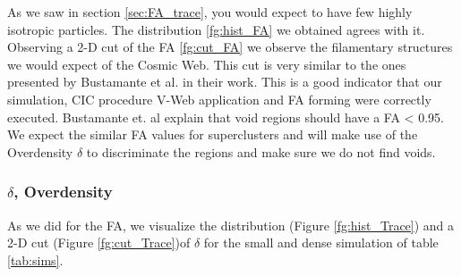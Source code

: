 \documentclass[12pt]{article}
\begin{document}
\begin{par}
As we saw in section \ref{sec:FA_trace}, you would
 expect to have few highly isotropic particles.
  The distribution \ref{fg:hist_FA} we obtained
   agrees with it.\\
Observing a 2-D cut of the FA \ref{fg:cut_FA} we
 observe the filamentary structures we would
  expect of the Cosmic Web. This cut is very
   similar to the ones presented by  Bustamante et
   al.  \cite{bustamante_tensor_2015} in their
    work. This is a good indicator that our
     simulation, CIC procedure V-Web application
      and FA forming were correctly executed.
       Bustamante et. al  explain that void
        regions should have a FA < 0.95. We expect
         the similar FA values for superclusters
          and will make use of the Overdensity
           $\delta$ to discriminate the    
            regions and make sure we do not find
             voids.

\end{par}


\subsubsection{$\delta$, Overdensity}
As we did for the FA, we visualize the
 distribution (Figure \ref{fg:hist_Trace}) and a
  2-D cut (Figure \ref{fg:cut_Trace})of $\delta$
   for the small and dense simulation of table
    \ref{tab:sims}.
\end{document}
